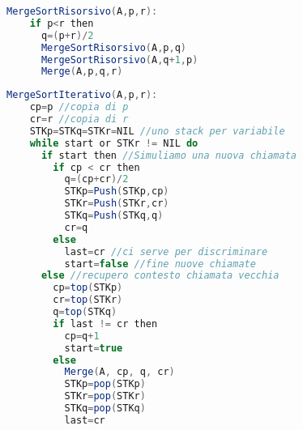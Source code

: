 \begin{lstlisting}[language=Java]
  MergeSortRisorsivo(A,p,r):
    if p<r then
      q=(p+r)/2
      MergeSortRisorsivo(A,p,q)
      MergeSortRisorsivo(A,q+1,p)
      Merge(A,p,q,r)
\end{lstlisting}

\begin{lstlisting}[language=Java]
  MergeSortIterativo(A,p,r):
    cp=p //copia di p 
    cr=r //copia di r 
    STKp=STKq=STKr=NIL //uno stack per variabile
    while start or STKr != NIL do
      if start then //Simuliamo una nuova chiamata
        if cp < cr then
          q=(cp+cr)/2
          STKp=Push(STKp,cp)
          STKr=Push(STKr,cr)
          STKq=Push(STKq,q)
          cr=q
        else
          last=cr //ci serve per discriminare
          start=false //fine nuove chiamate
      else //recupero contesto chiamata vecchia
        cp=top(STKp)
        cr=top(STKr)
        q=top(STKq)
        if last != cr then
          cp=q+1
          start=true
        else
          Merge(A, cp, q, cr)
          STKp=pop(STKp)
          STKr=pop(STKr)
          STKq=pop(STKq)
          last=cr
    
\end{lstlisting}

